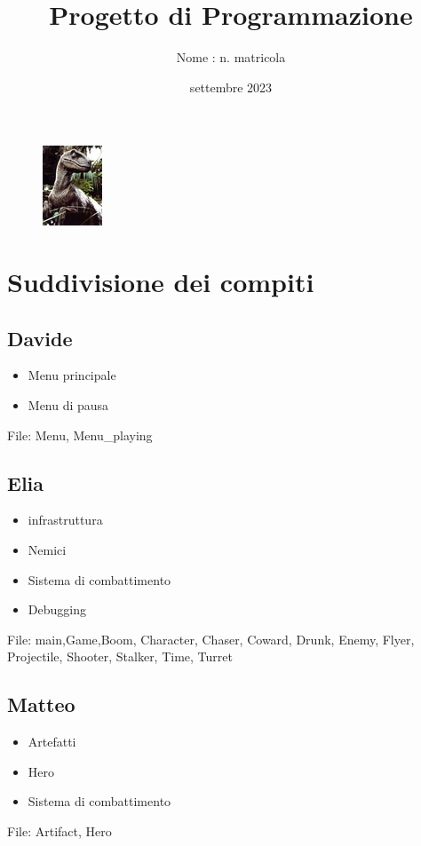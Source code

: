 \documentclass[12pt]{article}
\title{Progetto di Programmazione}
\author{Nome : n. matricola}
\date{settembre 2023}
\begin{document}
\maketitle

\begin{figure}[h]
    \centering
    \includegraphics{raptor.jpg}
\end{figure}

\newpage


\section*{Suddivisione dei compiti}
\subsection*{Davide}
\begin{itemize}
    \item Menu principale
    \item Menu di pausa
\end{itemize}
File: Menu, Menu\_playing
 
\subsection*{Elia}
\begin{itemize}
    \item infrastruttura
    \item Nemici 
    \item Sistema di combattimento
    \item Debugging
\end{itemize}
File: main,Game,Boom, Character, Chaser, Coward, Drunk, Enemy, Flyer, Projectile, Shooter, Stalker, Time, Turret

\subsection*{Matteo}
\begin{itemize}
    \item Artefatti
    \item Hero
    \item Sistema di combattimento
\end{itemize}
File: Artifact, Hero
\end{document}
